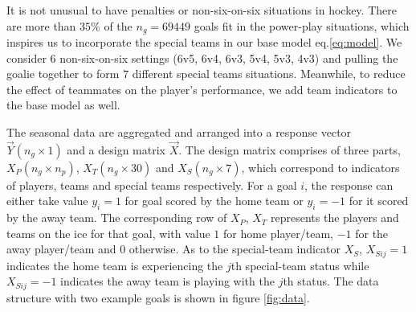 It is not unusual to have penalties or non-six-on-six situations in hockey. There are more than $35\%$ of the $n_g=69449$ goals fit in the power-play situations, which inspires us to incorporate the special teams in our base model eq.\eqref{eq:model}. We consider $6$ non-six-on-six settings (6v5, 6v4, 6v3, 5v4, 5v3, 4v3) and pulling the goalie together to form $7$ different special teams situations. Meanwhile, to reduce the effect of teammates on the player's performance, we add team indicators to the base model as well.

The seasonal data are aggregated and arranged into a response vector $\vec{Y}(n_g \times 1)$ and a design matrix $\vec{X}$. The design matrix comprises of three parts, $X_P(n_g\times n_p)$, $X_T(n_g\times 30)$ and $X_S(n_g\times 7)$, which correspond to indicators of players, teams and special teams respectively. For a goal $i$, the response can either take value $y_i=1$ for goal scored by the home team or $y_i={-1}$ for it scored by the away team. The corresponding row of $X_P$, $X_T$ represents the players and teams on the ice for that goal, with value $1$ for home player/team, ${-1}$ for the away player/team and $0$ otherwise. As to the special-team indicator $X_S$, $X_{Sij}=1$ indicates the home team is experiencing the $j$th special-team status while $X_{Sij}=-1$ indicates the away team is playing with the $j$th status. The data structure with two example goals is shown in figure \ref{fig:data}.

